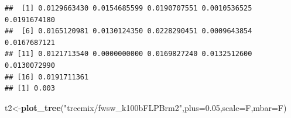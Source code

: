\documentclass[]{article}
\newenvironment{Shaded}{\begin{snugshade}}{\end{snugshade}}
\newcommand{\KeywordTok}[1]{\textcolor[rgb]{0.13,0.29,0.53}{\textbf{#1}}}
\newcommand{\DataTypeTok}[1]{\textcolor[rgb]{0.13,0.29,0.53}{#1}}
\newcommand{\FloatTok}[1]{\textcolor[rgb]{0.00,0.00,0.81}{#1}}
\newcommand{\StringTok}[1]{\textcolor[rgb]{0.31,0.60,0.02}{#1}}
\newcommand{\NormalTok}[1]{#1}
\begin{document}
\begin{verbatim}
##  [1] 0.0129663430 0.0154685599 0.0190707551 0.0010536525 0.0191674180
##  [6] 0.0165120981 0.0130124350 0.0228290451 0.0009643854 0.0167687121
## [11] 0.0121713540 0.0000000000 0.0169827240 0.0132512600 0.0130072990
## [16] 0.0191711361
## [1] 0.003
\end{verbatim}

\begin{Shaded}
\begin{Highlighting}[]
\NormalTok{t2<-}\KeywordTok{plot_tree}\NormalTok{(}\StringTok{"treemix/fwsw_k100bFLPBrm2"}\NormalTok{,}\DataTypeTok{plus=}\FloatTok{0.05}\NormalTok{,}\DataTypeTok{scale=}\NormalTok{F,}\DataTypeTok{mbar=}\NormalTok{F)}
\end{Highlighting}
\end{Shaded}
\end{document}
